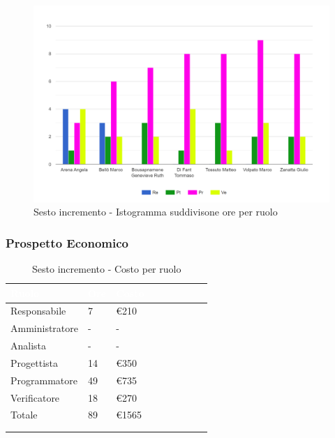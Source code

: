 {{      \begin{figure}[H]
        \includegraphics[width=15cm]{sezioni/Images/sesto.png}
        \centering
        \caption{Sesto incremento - Istogramma suddivisone ore per ruolo}
     \end{figure}
    }

    \subsubsection{Prospetto Economico}
    {
        \setlength{\freewidth}{\dimexpr\textwidth-30\tabcolsep}
        \renewcommand{\arraystretch}{1.0}
        \setlength{\aboverulesep}{0pt}
        \setlength{\belowrulesep}{0pt}
        \begin{longtable}{C{.4\freewidth} C{.2\freewidth} C{.2\freewidth} C{.2\freewidth} C{.2\freewidth} C{.2\freewidth} C{.2\freewidth} C{.2\freewidth} C{.2\freewidth}}
          \toprule
        \textcolor{white}{\textbf{Ruolo}}&
        \textcolor{white}{\textbf{Ore}}&
        \textcolor{white}{\textbf{Costo}}\\
        \toprule
        \endhead
            
        Responsabile  & 7 & €210\\
        Amministratore  & - & - \\
        Analista &- & -\\
        Progettista &14 &€350\\
        Programmatore &49 & €735\\
        Verificatore &18 &€270\\
        Totale&89&€1565\\
        \bottomrule
      \\
        \caption{Sesto incremento - Costo per ruolo}


\end{longtable}}}
